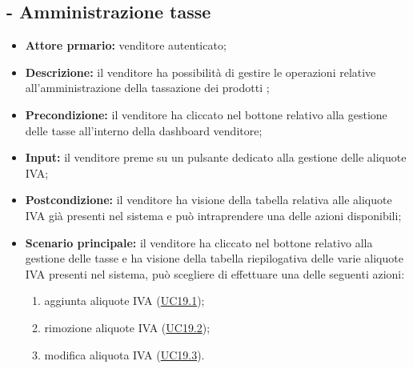 \stepUserCase
\subsection{ - Amministrazione tasse}
\begin{itemize}
    \item \textbf{Attore prmario:} venditore autenticato;
    \item \textbf{Descrizione:} il venditore ha possibilità di gestire le operazioni relative all’amministrazione della tassazione dei prodotti ;
    \item \textbf{Precondizione:} il venditore ha cliccato nel bottone relativo alla gestione delle tasse all’interno della dashboard venditore;
    \item \textbf{Input:} il venditore preme su un pulsante dedicato alla gestione delle aliquote IVA;
    \item \textbf{Postcondizione:} il venditore ha visione della tabella relativa alle aliquote IVA già presenti nel sistema e può intraprendere una delle azioni disponibili;
    \item \textbf{Scenario principale:} il venditore ha cliccato nel bottone relativo alla gestione delle tasse e ha visione della tabella riepilogativa delle varie aliquote IVA presenti nel sistema, può scegliere di effettuare una delle seguenti azioni:
          \begin{enumerate}
              \item aggiunta aliquote IVA (\hyperref[UC19.1]{UC19.1});
              \item rimozione aliquote IVA (\hyperref[UC19.2]{UC19.2});
              \item modifica aliquota IVA (\hyperref[UC19.3]{UC19.3}).
          \end{enumerate}
\end{itemize}

\stepsubUserCase
